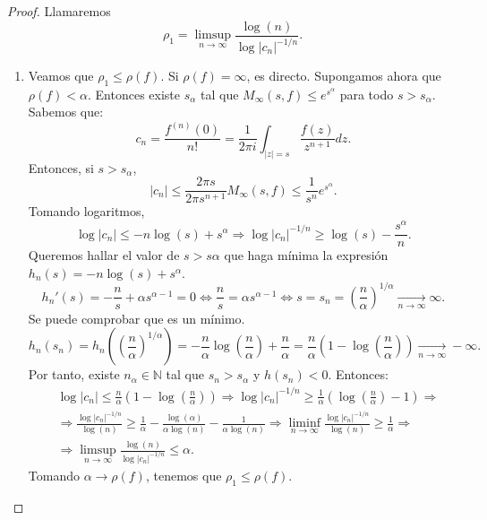 \begin{proof}
    Llamaremos
    $$\rho_1 = \limsup_{n \to \infty} \frac{\log(n)}{\log|c_n|^{-1/n}}.$$
    \begin{enumerate}
        \item Veamos que $\rho_1 \leq \rho(f)$.
              Si $\rho(f) = \infty$, es directo.
              Supongamos ahora que $\rho(f) < \alpha$.
              Entonces existe $s_\alpha$ tal que $M_\infty(s, f) \leq e^{s^\alpha}$ para todo $s > s_\alpha$.
              Sabemos que:
              $$c_n = \frac{f^{(n)}(0)}{n!} = \frac{1}{2\pi i} \int_{|z|=s} \frac{f(z)}{z^{n+1}}dz.$$
              Entonces, si $s > s_\alpha$,
              $$|c_n| \leq \frac{2\pi s}{2\pi s^{n+1}}M_\infty(s, f) \leq \frac{1}{s^n}e^{s^\alpha}.$$
              Tomando logaritmos,
              $$\log|c_n| \leq -n\log(s) + s^\alpha \Rightarrow \log|c_n|^{-1/n} \geq \log(s) - \frac{s^\alpha}{n}.$$
              Queremos hallar el valor de $s > s\alpha$ que haga mínima la expresión $h_n(s) = -n\log(s) + s^\alpha$.
              $$h_n'(s) = -\frac{n}{s} + \alpha s^{\alpha-1} = 0 \Leftrightarrow \frac{n}{s} = \alpha s^{\alpha-1} \Leftrightarrow s = s_n = \left(\frac{n}{\alpha}\right)^{1/\alpha} \xrightarrow[n \to \infty]{} \infty.$$
              Se puede comprobar que es un mínimo.
              $$h_n(s_n) = h_n\left(\left(\frac{n}{\alpha}\right)^{1/\alpha}\right) = -\frac{n}{\alpha}\log\left(\frac{n}{\alpha}\right) + \frac{n}{\alpha} = \frac{n}{\alpha}\left(1 - \log\left(\frac{n}{\alpha}\right)\right) \xrightarrow[n \to \infty]{} -\infty.$$
              Por tanto, existe $n_\alpha \in \mathbb{N}$ tal que $s_n > s_\alpha$ y $h(s_n) < 0$.
              Entonces:
              \begin{align*}
                   & \log|c_n| \leq \frac{n}{\alpha}\left(1 - \log\left(\frac{n}{\alpha}\right)\right) \Rightarrow \log|c_n|^{-1/n} \geq \frac{1}{\alpha}\left(\log\left(\frac{n}{\alpha}\right) - 1\right) \Rightarrow                                      \\
                   & \Rightarrow \frac{\log|c_n|^{-1/n}}{\log(n)} \geq \frac{1}{\alpha} - \frac{\log(\alpha)}{\alpha\log(n)} - \frac{1}{\alpha\log(n)} \Rightarrow \liminf_{n \to \infty} \frac{\log|c_n|^{-1/n}}{\log(n)} \geq \frac{1}{\alpha} \Rightarrow \\
                   & \Rightarrow \limsup_{n \to \infty} \frac{\log(n)}{\log|c_n|^{-1/n}} \leq \alpha.
              \end{align*}
              Tomando $\alpha \to \rho(f)$, tenemos que $\rho_1 \leq \rho(f)$.


\end{enumerate}
\end{proof}
